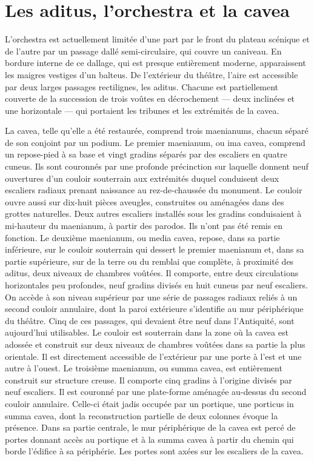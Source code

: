 		\section{Les \gls{aditus}, l'\gls{orchestra} et la \gls{cavea}}
		
	
	L'orchestra est actuellement limitée d'une part par le front du plateau scénique et de
l'autre par un passage dallé semi-circulaire, qui couvre un caniveau. En bordure interne de
ce dallage, qui est presque entièrement moderne, apparaissent les maigres vestiges d'un
balteus. De l'extérieur du théâtre, l'aire est accessible par deux larges passages rectilignes,
les aditus. Chacune est partiellement couverte de la succession de trois voûtes en
décrochement — deux inclinées et une horizontale — qui portaient les tribunes et les
extrémités de la cavea.
	
		La cavea, telle qu'elle a été restaurée, comprend trois maenianums, chacun séparé
de son conjoint par un podium.
Le premier maenianum, ou ima cavea, comprend un repose-pied à sa base et vingt
gradins séparés par des escaliers en quatre cuneus. Ils sont couronnés par une profonde
précinction sur laquelle donnent neuf ouvertures d'un couloir souterrain aux extrémités
duquel conduisent deux escaliers radiaux prenant naissance au rez-de-chaussée du
monument. Le couloir ouvre aussi sur dix-huit pièces aveugles, construites ou aménagées
dans des grottes naturelles. Deux autres escaliers installés sous les gradins conduisaient à
mi-hauteur du maenianum, à partir des parodos. Ils n'ont pas été remis en fonction.
Le deuxième maenianum, ou media cavea, repose, dans sa partie inférieure, sur le
couloir souterrain qui dessert le premier maenianum et, dans sa partie supérieure, sur de la
terre ou du remblai que complète, à proximité des aditus, deux niveaux de chambres
voûtées. Il comporte, entre deux circulations horizontales peu profondes, neuf gradins
divisés en huit cuneus par neuf escaliers. On accède à son niveau supérieur par une série de
passages radiaux reliés à un second couloir annulaire, dont la paroi extérieure s'identifie au
mur périphérique du théâtre. Cinq de ces passages, qui devaient être neuf dans l'Antiquité,
sont aujourd'hui utilisables. Le couloir est souterrain dans la zone où la cavea est adossée et
construit sur deux niveaux de chambres voûtées dans sa partie la plus orientale. Il est
directement accessible de l'extérieur par une porte à l'est et une autre à l'ouest.
Le troisième maenianum, ou summa cavea, est entièrement construit sur structure creuse. Il comporte cinq gradins à l'origine divisés par neuf escaliers. Il est couronné par une
plate-forme aménagée au-dessus du second couloir annulaire. Celle-ci était jadis occupée
par un portique, une porticus in summa cavea, dont la reconstruction partielle de deux
colonnes évoque la présence. Dans sa partie centrale, le mur périphérique de la cavea est
percé de portes donnant accès au portique et à la summa cavea à partir du chemin qui borde
l'édifice à sa périphérie. Les portes sont axées sur les escaliers de la cavea.
		
